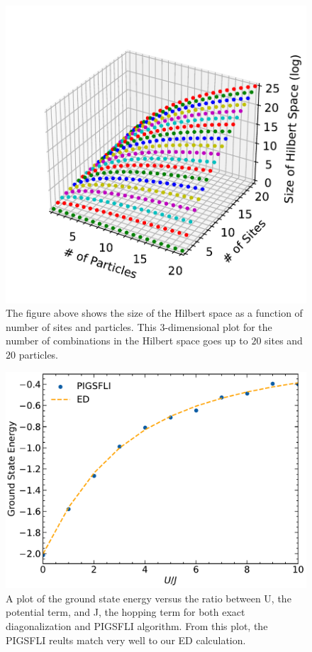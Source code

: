 \begin{figure}[H]
\centering
\includegraphics[scale=0.5]{../figures/hilbert_space_size.pdf}
\caption{The figure above shows the size of the Hilbert space as a function of number of sites and particles. This 3-dimensional plot for the number of combinations in the Hilbert space goes up to $20$ sites and $20$ particles.}
\label{fig:hilbert_space_size}
\end{figure}


\begin{figure}[H]
\centering
\includegraphics[scale=0.5]{../figures/total_energy.pdf}
\caption{A plot of the ground state energy versus the ratio between U, the potential term, and J, the hopping term for both exact diagonalization and PIGSFLI algorithm. From this plot, the PIGSFLI reults match very well to our ED calculation.}
\label{fig:total_energy}
\end{figure}

